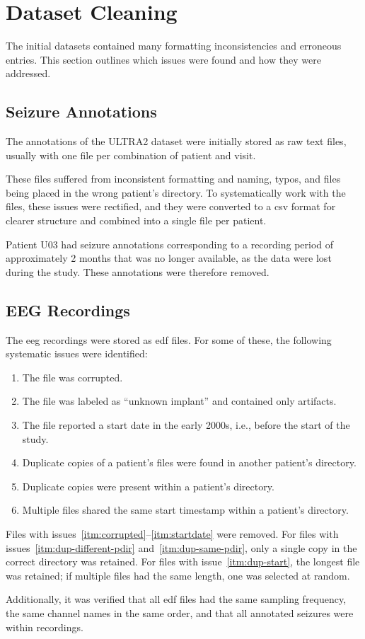 \section{Dataset Cleaning}\label{sec:dataset-cleaning}
The initial datasets contained many formatting inconsistencies and erroneous entries.
This section outlines which issues were found and how they were addressed.


\subsection{Seizure Annotations}\label{subsec:seizure-annotations}
The annotations of the ULTRA2 dataset were initially stored as raw text files, usually with one file per combination of patient and visit.

These files suffered from inconsistent formatting and naming, typos, and files being placed in the wrong patient's directory.
To systematically work with the files, these issues were rectified, and they were converted to a \gls{csv} format for clearer structure and combined into a single file per patient.

Patient U03 had seizure annotations corresponding to a recording period of approximately 2 months that was no longer available, as the data were lost during the study.
These annotations were therefore removed.


\subsection{EEG Recordings}\label{subsec:eeg-recordings}
The \gls{eeg} recordings were stored as \gls{edf} files.
For some of these, the following systematic issues were identified:
\begin{enumerate}
    \item \label{itm:corrupted} The file was corrupted.
    \item \label{itm:unknown} The file was labeled as ``unknown implant'' and contained only artifacts.
    \item \label{itm:startdate} The file reported a start date in the early 2000s, i.e., before the start of the study.
    \item \label{itm:dup-different-pdir} Duplicate copies of a patient's files were found in another patient's directory.
    \item \label{itm:dup-same-pdir} Duplicate copies were present within a patient's directory.
    \item \label{itm:dup-start} Multiple files shared the same start timestamp within a patient's directory.
\end{enumerate}

Files with issues~\ref{itm:corrupted}--\ref{itm:startdate} were removed.
For files with issues~\ref{itm:dup-different-pdir} and~\ref{itm:dup-same-pdir}, only a single copy in the correct directory was retained.
For files with issue~\ref{itm:dup-start}, the longest file was retained; if multiple files had the same length, one was selected at random.

Additionally, it was verified that all \gls{edf} files had the same sampling frequency, the same channel names in the same order, and that all annotated seizures were within recordings.

